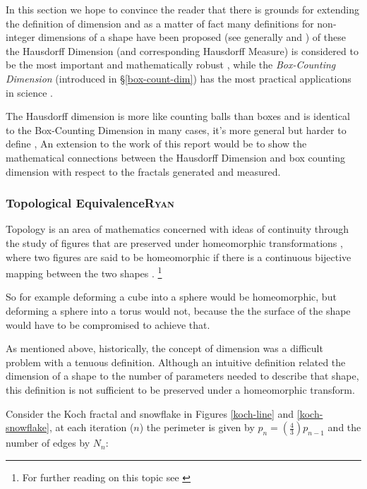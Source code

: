 \documentclass[a4paper,11pt,twoside]{article}
\begin{document}
In this section we hope to convince the reader that there is grounds for
extending the definition of dimension and as a matter of fact many definitions
for non-integer dimensions of a shape have been proposed (see generally
\cite[Ch. 39]{mandelbrotFractalGeometryNature1982} and
\cite[\S 1.3]{gouyetPhysicsFractalStructures1996}) of these the Hausdorff Dimension (and corresponding Hausdorff Measure) is
considered to be the most important and mathematically robust
\cite[p. 27]{falconerFractalGeometryMathematical2003b}, while the \emph{Box-Counting Dimension} (introduced in \S \ref{box-count-dim})
has the most practical applications in science
\cite[p. 192]{peitgenChaosFractalsNew2004}.

The Hausdorff dimension is more like counting balls than boxes and is identical
to the Box-Counting Dimension in many cases, it's more general but harder to define
\cite{sandersonFractalsAreTypically2017}, An extension to the work of this report
would be to show the mathematical connections between the Hausdorff Dimension
and box counting dimension with respect to the fractals generated and measured.


\subsubsection{Topological Equivalence\hfill{}\textsc{Ryan}}
\label{topological-equivalence}
Topology is an area of mathematics concerned with ideas of continuity through the study of figures that are preserved under homeomorphic transformations \cite{gilmoreTopologyChaosAlice2002} , where two figures are said to be homeomorphic if there is a continuous bijective mapping between the two shapes \cite[p. 105]{peitgenChaosFractalsNew2004}
.
\footnote{For further reading on this topic see \cite[p. 106]{peitgenChaosFractalsNew2004}}

So for example deforming a cube into a sphere would be homeomorphic, but deforming a sphere into a torus would not, because the the surface of the shape would have to be compromised to achieve that.

As mentioned above, historically, the concept of dimension was a difficult problem with a tenuous
definition.  Although an intuitive definition related the dimension of a shape to
the number of parameters needed to describe that shape, this definition is not
sufficient to be preserved under a homeomorphic transform.

Consider the Koch fractal and snowflake in Figures \ref{koch-line} and \ref{koch-snowflake}, at each iteration (\(n\)) the perimeter is given by \(p_{n}= \left(\frac{4}{3} \right)p_{n-1}\) and the number of edges by \(N_{n}\):
\end{document}
